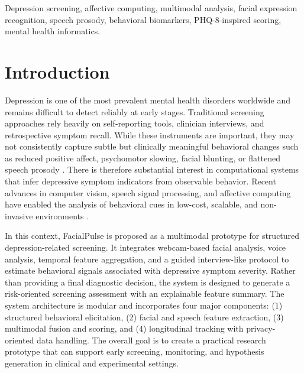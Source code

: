 \documentclass[conference, 12pt]{IEEEtran}
\begin{document}
\begin{IEEEkeywords}
Depression screening, affective computing, multimodal analysis, facial expression recognition, speech prosody, behavioral biomarkers, PHQ-8-inspired scoring, mental health informatics.
\end{IEEEkeywords}

\section{Introduction}
Depression is one of the most prevalent mental health disorders worldwide and remains difficult to detect reliably at early stages. Traditional screening approaches rely heavily on self-reporting tools, clinician interviews, and retrospective symptom recall. While these instruments are important, they may not consistently capture subtle but clinically meaningful behavioral changes such as reduced positive affect, psychomotor slowing, facial blunting, or flattened speech prosody \cite{ref1, ref2}. There is therefore substantial interest in computational systems that infer depressive symptom indicators from observable behavior. Recent advances in computer vision, speech signal processing, and affective computing have enabled the analysis of behavioral cues in low-cost, scalable, and non-invasive environments \cite{ref3, ref5}. 

In this context, FacialPulse is proposed as a multimodal prototype for structured depression-related screening. It integrates webcam-based facial analysis, voice analysis, temporal feature aggregation, and a guided interview-like protocol to estimate behavioral signals associated with depressive symptom severity. Rather than providing a final diagnostic decision, the system is designed to generate a risk-oriented screening assessment with an explainable feature summary. The system architecture is modular and incorporates four major components: (1) structured behavioral elicitation, (2) facial and speech feature extraction, (3) multimodal fusion and scoring, and (4) longitudinal tracking with privacy-oriented data handling. The overall goal is to create a practical research prototype that can support early screening, monitoring, and hypothesis generation in clinical and experimental settings.
\end{document}

